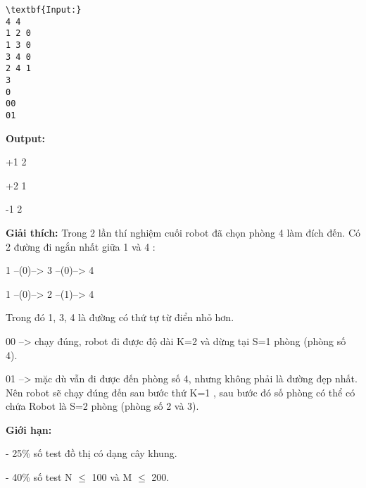 \begin{verbatim}
\textbf{Input:}
4 4
1 2 0
1 3 0
3 4 0
2 4 1
3
0
00
01\end{verbatim}

\textbf{Output:}


+1 2


+2 1


-1 2

\textbf{Giải thích: } Trong 2 lần thí nghiệm cuối robot đã chọn phòng 4 làm đích đến. Có 2 đường đi ngắn nhất giữa 1 và 4 :

1 --(0)--> 3 --(0)--> 4

1 --(0)--> 2 --(1)--> 4

Trong đó 1, 3, 4 là đường có thứ tự từ điển nhỏ hơn.

00 --> chạy đúng, robot đi được độ dài K=2 và dừng tại S=1 phòng (phòng số 4).

01 --> mặc dù vẫn đi được đến phòng số 4, nhưng không phải là đường đẹp nhất. Nên robot sẽ chạy đúng đến sau bước thứ K=1 , sau bước đó số phòng có thể có chứa Robot là S=2 phòng (phòng số 2 và 3).

\textbf{Giới hạn: }

- 25\% số test đồ thị có dạng cây khung.

- 40\% số test N $\le$ 100 và M $\le$ 200.